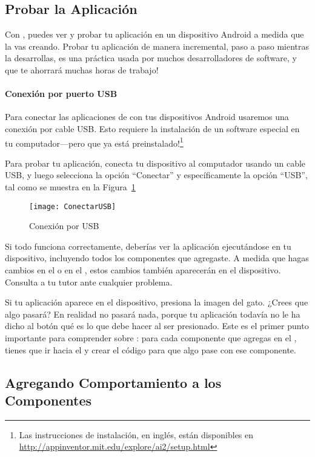 \subsection*{Probar la Aplicación}

Con \AppInventor, puedes ver y probar tu aplicación en un dispositivo Android a medida que la vas creando. Probar tu aplicación de manera incremental, paso a paso mientras la desarrollas, es una práctica usada por muchos desarrolladores de software, y que te ahorrará muchas horas de trabajo!

\paragraph{Conexión por puerto USB}
Para conectar las aplicaciones de \AppInventor con tus dispositivos Android usaremos una conexión por cable USB. Esto requiere la instalación de un software especial en tu computador---pero que ya está preinstalado!\footnote{Las instrucciones de instalación, en inglés, están disponibles en \url{http://appinventor.mit.edu/explore/ai2/setup.html}}

Para probar tu aplicación, conecta tu dispositivo al computador usando un cable USB, y luego selecciona la opción ``Conectar'' y específicamente la opción ``USB'', tal como se muestra en la Figura~\ref{fig:conectarUSB}

\begin{figure}[H]
  \centering
  \texttt{[image: ConectarUSB]}
  \caption{Conexión \AppInventor por USB}
  \label{fig:conectarUSB}
\end{figure}

Si todo funciona correctamente, deberías ver la aplicación  ejecutándose en tu dispositivo, incluyendo todos los componentes que agregaste. A medida que hagas cambios en el \componentDesigner o en el \blockEditor, estos cambios también aparecerán en el dispositivo. Consulta a tu tutor ante cualquier problema.

Si tu aplicación aparece en el dispositivo, presiona la imagen del gato. ¿Crees que algo pasará? En realidad no pasará nada, porque tu aplicación todavía no le ha dicho al botón qué es lo que debe hacer al ser presionado. Este es el primer punto importante para comprender sobre \AppInventor: para cada componente que agregas en el \designer, tienes que ir hacia el \blockEditor y crear el código para que algo pase con ese componente.

\subsection*{Agregando Comportamiento a los Componentes}

